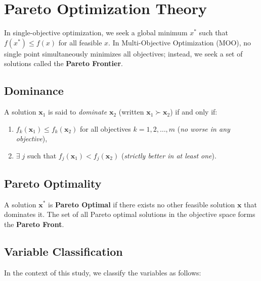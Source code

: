 \documentclass[12pt, a4paper]{report}
\begin{document}
\section{Pareto Optimization Theory}
In single-objective optimization, we seek a global minimum $x^*$ such that $f(x^*) \leq f(x)$ for all feasible $x$. In Multi-Objective Optimization (MOO), no single point simultaneously minimizes all objectives; instead, we seek a set of solutions called the \textbf{Pareto Frontier}.

\subsection{Dominance}
A solution $\mathbf{x}_1$ is said to \textit{dominate} $\mathbf{x}_2$ (written $\mathbf{x}_1 \succ \mathbf{x}_2$) if and only if:
\begin{enumerate}
    \item $f_k(\mathbf{x}_1) \leq f_k(\mathbf{x}_2)$ for all objectives $k = 1, 2, \ldots, m$ \quad (\textit{no worse in any objective}),
    \item $\exists\; j$ such that $f_j(\mathbf{x}_1) < f_j(\mathbf{x}_2)$ \quad (\textit{strictly better in at least one}).
\end{enumerate}

\subsection{Pareto Optimality}
A solution $\mathbf{x}^*$ is \textbf{Pareto Optimal} if there exists no other feasible solution $\mathbf{x}$ that dominates it. The set of all Pareto optimal solutions in the objective space forms the \textbf{Pareto Front}.

\subsection{Variable Classification}
In the context of this study, we classify the variables as follows:
\end{document}
